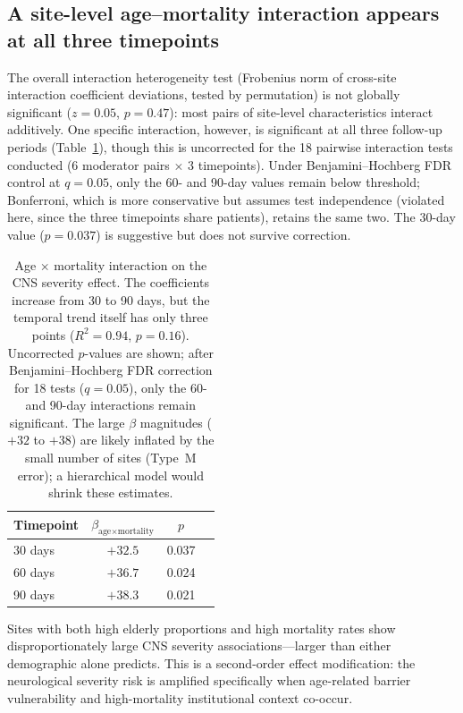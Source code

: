 \documentclass{article}
\begin{document}
\subsection{A site-level age--mortality interaction appears at all three timepoints}

The overall interaction heterogeneity test (Frobenius norm of cross-site interaction coefficient deviations, tested by permutation) is not globally significant ($z = 0.05$, $p = 0.47$): most pairs of site-level characteristics interact additively.
One specific interaction, however, is significant at all three follow-up periods (Table~\ref{tab:interaction}), though this is uncorrected for the 18 pairwise interaction tests conducted (6 moderator pairs $\times$ 3 timepoints).  Under Benjamini--Hochberg FDR control at $q = 0.05$, only the 60- and 90-day values remain below threshold; Bonferroni, which is more conservative but assumes test independence (violated here, since the three timepoints share patients), retains the same two.  The 30-day value ($p = 0.037$) is suggestive but does not survive correction.

\begin{table}[t]
\centering
\caption{Age $\times$ mortality interaction on the CNS severity effect. The coefficients increase from 30 to 90 days, but the temporal trend itself has only three points ($R^2 = 0.94$, $p = 0.16$). Uncorrected $p$-values are shown; after Benjamini--Hochberg FDR correction for 18 tests ($q = 0.05$), only the 60- and 90-day interactions remain significant. The large $\beta$ magnitudes ($+32$ to $+38$) are likely inflated by the small number of sites (Type~M error); a hierarchical model would shrink these estimates.}
\label{tab:interaction}
\begin{tabular}{lccc}
\toprule
Timepoint & $\beta_{\text{age} \times \text{mortality}}$ & $p$ \\
\midrule
30 days  & $+32.5$ & 0.037 \\
60 days  & $+36.7$ & 0.024 \\
90 days  & $+38.3$ & 0.021 \\
\bottomrule
\end{tabular}
\end{table}

Sites with both high elderly proportions and high mortality rates show disproportionately large CNS severity associations---larger than either demographic alone predicts.
This is a second-order effect modification: the neurological severity risk is amplified specifically when age-related barrier vulnerability and high-mortality institutional context co-occur.
\end{document}

